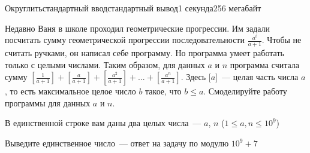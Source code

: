 \begin{problem}{Округлить}{стандартный ввод}{стандартный вывод}{1 секунда}{256 мегабайт}

Недавно Ваня в школе проходил геометрические прогрессии. Им задали посчитать сумму геометрической прогрессии последовательности $\frac{a^i}{a + 1}$. Чтобы не считать ручками, он написал себе программу. Но программа умеет работать только с целыми числами. Таким образом, для данных $a$ и $n$ программа считала сумму $[\frac{1}{a+1}] + [\frac{a}{a+1}] + [\frac{a^2}{a+1}] + ... + [\frac{a^n}{a+1}]$. Здесь [$a$]~--- целая часть числа $a$, то есть максимальное целое число $b$ такое, что $b \leq a$. Смоделируйте работу программы для данных $a$ и $n$.

\InputFile
В единственной строке вам даны два целых числа~--- $a$, $n$ ($1 \leq a, n \leq 10^9$)

\OutputFile
Выведите единственное число~--- ответ на задачу по модулю $10^9 + 7$

\Examples

\begin{example}
%
%
%
\end{example}

\end{problem}

